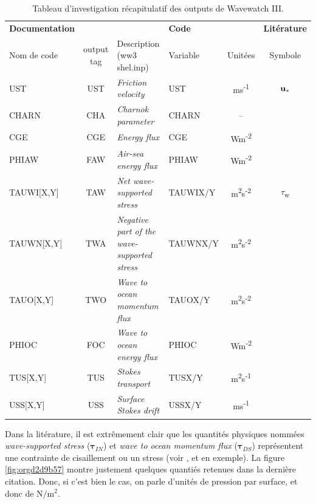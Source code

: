 \documentclass[10pt]{article}
\numberwithin{equation}{section}
\newcommand{\ust}{\vb{u}_{\ast}}
\begin{document}
\begin{table}[htbp]
\caption{\label{tab:orgf682837}Tableau d'investigation récapitulatif des outputs de Wavewatch III.}
\centering
\begin{tabular}{lcl|lc|c}
\hline
\hline
\textbf{Documentation} &  &  & \textbf{Code} &  & \textbf{Litérature}\\[0pt]
Nom de code & output tag & Description (ww3 shel.inp) & Variable & Unitées & Symbole\\[0pt]
\hline
UST & UST & \emph{Friction velocity} & UST & ms\textsuperscript{-1} & \(\ust\)\\[0pt]
CHARN & CHA & \emph{Charnok parameter} & CHARN & -- & \\[0pt]
CGE & CGE & \emph{Energy flux} & CGE & Wm\textsuperscript{-2} & \\[0pt]
PHIAW & FAW & \emph{Air-sea energy flux} & PHIAW & Wm\textsuperscript{-2} & \\[0pt]
TAUWI[X,Y] & TAW & \emph{Net wave-supported stress} & TAUWIX/Y & m\textsuperscript{2}s\textsuperscript{-2} & \(\tau\)\textsubscript{w}\\[0pt]
TAUWN[X,Y] & TWA & \emph{Negative part of the wave-supported stress} & TAUWNX/Y & m\textsuperscript{2}s\textsuperscript{-2} & \\[0pt]
\hline
TAUO[X,Y] & TWO & \emph{Wave to ocean momentum flux} & TAUOX/Y & m\textsuperscript{2}s\textsuperscript{-2} & \\[0pt]
PHIOC & FOC & \emph{Wave to ocean energy flux} & PHIOC & Wm\textsuperscript{-2} & \\[0pt]
TUS[X,Y] & TUS & \emph{Stokes transport} & TUSX/Y & m\textsuperscript{2}s\textsuperscript{-1} & \\[0pt]
USS[X,Y] & USS & \emph{Surface Stokes drift} & USSX/Y & ms\textsuperscript{-1} & \\[0pt]
\hline
\end{tabular}
\end{table}

Dans la litérature, il est extrêmement clair que les quantités physiques nommées \emph{wave-supported stress} (\(\boldsymbol{\tau}_{IN}\)) et \emph{wave to ocean momentum flux} (\(\boldsymbol{\tau}_{DS}\)) représentent une contrainte de cisaillement ou un stress (voir \Textcite{breivik_al_2015}, \Textcite{ardhuin2010semiempirical} et \Textcite{couvelard2020development} en exemple).
La figure \ref{fig:orgd2d9b57} montre justement quelques quantiés retenues dans la dernière citation.
Donc, si c'est bien le cas, on parle d'unités de pression par surface, et donc de \(\mathrm{N}/\mathrm{m}^2\).\bigskip
\end{document}
